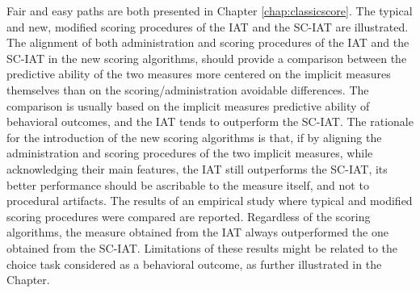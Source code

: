 \documentclass[12pt]{book}
\begin{document}
Fair and easy paths are both presented in Chapter \ref{chap:classicscore}.  
The typical and new, modified scoring procedures of the IAT and the SC-IAT are illustrated.
The alignment of both administration and scoring procedures of the IAT and the SC-IAT in the new scoring algorithms, should provide a comparison between the predictive ability of the two measures more centered on the implicit measures themselves than on the scoring/administration avoidable differences.
The comparison is usually based on the implicit measures predictive ability of behavioral outcomes, and the IAT tends to outperform the SC-IAT.
The rationale for the introduction of the new scoring algorithms is that, if by aligning the administration and scoring procedures of the two implicit measures, while acknowledging their main features, the IAT still outperforms the SC-IAT, its better performance should be ascribable to the measure itself, and not to procedural artifacts.
The results of an empirical study where typical and modified scoring procedures were compared are reported. Regardless of the scoring algorithms, the measure obtained from the IAT always outperformed the one obtained from the SC-IAT. Limitations of these results might be related to the choice task considered as a behavioral outcome, as further illustrated in the Chapter.
\end{document}
